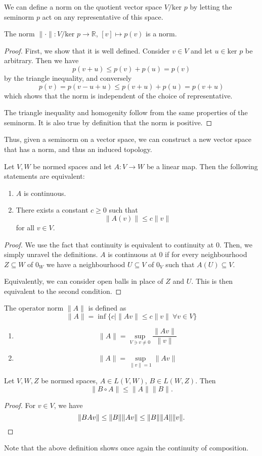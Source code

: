 \documentclass[prb,12pt]{revtex4-2}
\theoremstyle{definition}
\theoremstyle{definition}
\theoremstyle{definition}
\newenvironment{parts}{\begin{enumerate}[label=(\alph*)]}{\end{enumerate}}
\newcommand{\R}{\mathbb{R}}
\begin{document}
	We can define a norm on the quotient vector space $V / \text{ker } p$ by letting the seminorm $p$ act on any representative of this space. 
	\begin{Theorem}
		The norm $\|\cdot \|: V / \text{ker } p\to \R$,  $[v] \mapsto p(v)$ is a norm.
	\end{Theorem}
\begin{proof}
	First, we show that it is well defined. Consider $v\in V$ and let $u\in \text{ker }p$ be arbitrary. Then we have
	\[p(v+u)\le p(v)+p(u)=p(v)\]
	by the triangle inequality, and conversely
	\[p(v)=p(v-u+u)\le p(v+u)+p(u)=p(v+u)\]
	which shows that the norm is independent of the choice of representative.
	
	The triangle inequality and homogenity follow from the same properties of the seminorm. It is also true by definition that the norm is positive.
\end{proof}
Thus, given a seminorm on a vector space, we can construct a new vector space that has a norm, and thus an induced topology. 
\begin{Theorem}
	Let $V,W$ be normed spaces and let $A:V\to W$ be a linear map. Then the following statements are equivalent:
	\begin{parts}
		\item $A$ is continuous.
		\item There exists a constant $c\ge 0$ such that
		\[\|A(v)\| \le c\|v\|\]
		for all $v\in V$.
	\end{parts}
\end{Theorem}
\begin{proof}
	We use the fact that continuity is equivalent to continuity at 0. Then, we simply unravel the definitions. $A$ is continuous at 0 if for every neighbourhood $Z\subseteq W$ of $0_W$ we have a neighbourhood $U\subseteq V$ of $0_V$ such that $A(U)\subseteq V$.
	
	Equivalently, we can consider open balls in place of $Z$ and $U$. This is then equivalent to the second condition.
\end{proof}
	\begin{Definition}
		The operator norm $\|A\|$ is defined as
		\[\|A\|=\inf \{c| \|Av\| \le c\|v\|~\forall v\in V\}\]
	\end{Definition}
	\begin{Corollary}\noindent
		\begin{parts}
			\item \[\|A\|=\sup_{V\ni v \neq 0}\frac{\|Av\|}{\|v\|}\]
			\item \[\|A\| = \sup_{\|v\|=1}\|A v\|\]
		\end{parts}
	\end{Corollary}
	\begin{Theorem}
		Let $V,W, Z$ be normed spaces, $A\in L(V,W)$, $B\in L(W,Z)$. Then
		\[\|B\circ A\| \le \|A\| \|B\|.\]
	\end{Theorem}
\begin{proof}
	For $v\in V$, we have
	\[\|BAv\|\le \|B\| \|Av\| \le \|B\| \|A\| \|v\|.\qedhere\]
\end{proof}
Note that the above definition shows once again the continuity of composition.
\end{document}

